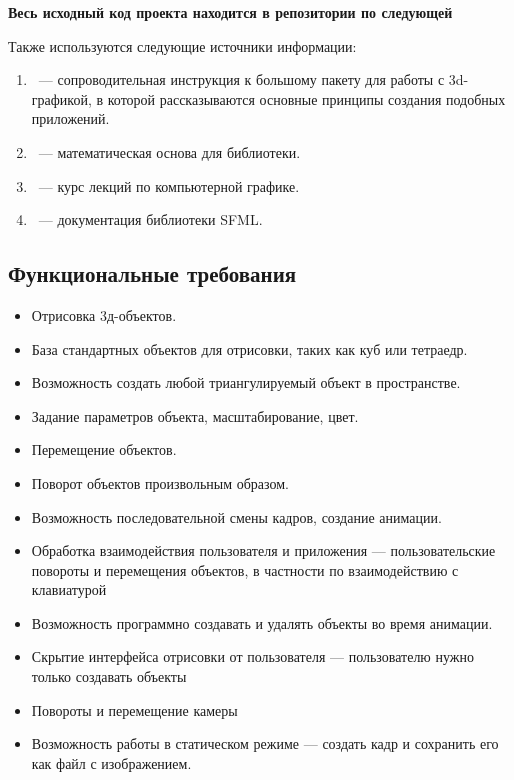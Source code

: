 \documentclass{article}
\begin{document}
\begin{center}\textbf{Весь исходный код проекта находится в репозитории по следующей \href{https://github.com/kik0s/3d-framework}{\color{blue}{ссылке}}} \end{center}

Также используются следующие источники информации:

\begin{enumerate}
\item \cite{vtkBook}~--- сопроводительная инструкция к большому пакету для работы с 3d-графикой, в которой рассказываются основные принципы создания подобных приложений.
\item \cite{Math3d}~--- математическая основа для библиотеки.
\item \cite{urtech}~--- курс лекций по компьютерной графике.
\item \cite{SFML}~--- документация библиотеки SFML.
\end{enumerate}

\subsection{Функциональные требования}

\begin{itemize}
\item Отрисовка 3д-объектов.
\item База стандартных объектов для отрисовки, таких как куб или тетраедр.
\item Возможность создать любой триангулируемый объект в пространстве.
\item Задание параметров объекта, масштабирование, цвет.
\item Перемещение объектов.
\item Поворот объектов произвольным образом.
\item Возможность последовательной смены кадров, создание анимации.
\item Обработка взаимодействия пользователя и приложения — пользовательские повороты и перемещения объектов, в частности по взаимодействию с клавиатурой
\item Возможность программно создавать и удалять объекты во время анимации.
\item Скрытие интерфейса отрисовки от пользователя — пользователю нужно только создавать объекты
\item Повороты и перемещение камеры
\item Возможность работы в статическом режиме — создать кадр и сохранить его как файл с изображением.
\end{itemize}
\end{document}
